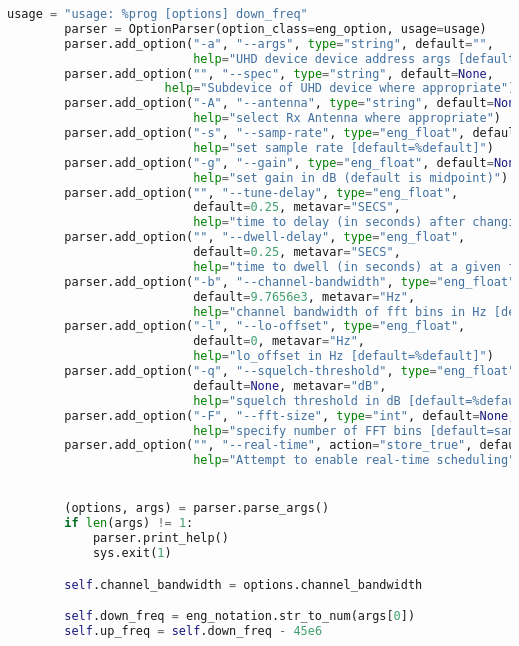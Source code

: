 \begin{lstlisting}[language=Python]
        usage = "usage: %prog [options] down_freq"
        parser = OptionParser(option_class=eng_option, usage=usage)
        parser.add_option("-a", "--args", type="string", default="",
                          help="UHD device device address args [default=%default]")
        parser.add_option("", "--spec", type="string", default=None,
	                  help="Subdevice of UHD device where appropriate")
        parser.add_option("-A", "--antenna", type="string", default=None,
                          help="select Rx Antenna where appropriate")
        parser.add_option("-s", "--samp-rate", type="eng_float", default=10e6,
                          help="set sample rate [default=%default]")
        parser.add_option("-g", "--gain", type="eng_float", default=None,
                          help="set gain in dB (default is midpoint)")
        parser.add_option("", "--tune-delay", type="eng_float",
                          default=0.25, metavar="SECS",
                          help="time to delay (in seconds) after changing frequency [default=%default]")
        parser.add_option("", "--dwell-delay", type="eng_float",
                          default=0.25, metavar="SECS",
                          help="time to dwell (in seconds) at a given frequency [default=%default]")
        parser.add_option("-b", "--channel-bandwidth", type="eng_float",
                          default=9.7656e3, metavar="Hz",
                          help="channel bandwidth of fft bins in Hz [default=%default]")
        parser.add_option("-l", "--lo-offset", type="eng_float",
                          default=0, metavar="Hz",
                          help="lo_offset in Hz [default=%default]")
        parser.add_option("-q", "--squelch-threshold", type="eng_float",
                          default=None, metavar="dB",
                          help="squelch threshold in dB [default=%default]")
        parser.add_option("-F", "--fft-size", type="int", default=None,
                          help="specify number of FFT bins [default=samp_rate/channel_bw]")
        parser.add_option("", "--real-time", action="store_true", default=False,
                          help="Attempt to enable real-time scheduling")


        (options, args) = parser.parse_args()
        if len(args) != 1:
            parser.print_help()
            sys.exit(1)

        self.channel_bandwidth = options.channel_bandwidth

        self.down_freq = eng_notation.str_to_num(args[0])
        self.up_freq = self.down_freq - 45e6




\end{lstlisting}

